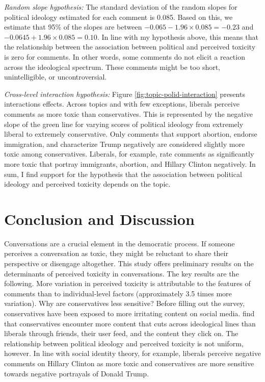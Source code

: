 \documentclass{article}
\begin{document}
\textit{Random slope hypothesis:} The standard deviation of the random slopes for political ideology estimated for each comment is 0.085. Based on this, we estimate that 95\% of the slopes are between $-0.065 - 1.96\times 0.085=-0.23$ and  $-0.0645 + 1.96 \times 0.085=0.10$. In line with my hypothesis above, this means that the relationship between the association between political and perceived toxicity is zero for comments. In other words, some comments do not elicit a reaction across the ideological spectrum. These comments might be too short, unintelligible, or uncontroversial. 

\textit{Cross-level interaction hypothesis:} Figure \ref{fig:topic-polid-interaction} presents interactions effects. Across topics and with few exceptions, liberals perceive comments as more toxic than conservatives. This is represented by the negative slope of the green line for varying scores of political ideology from extremely liberal to extremely conservative. Only comments that support abortion, endorse immigration, and characterize Trump negatively are considered slightly more toxic among conservatives. Liberals, for example, rate comments as significantly more toxic that portray immigrants, abortion, and Hillary Clinton negatively. In sum, I find support for the hypothesis that the association between political ideology and perceived toxicity depends on the topic. 



\section{Conclusion and Discussion}

Conversations are a crucial element in the democratic process. If someone perceives a conversation as toxic, they might be reluctant to share their perspective or disengage altogether. This study offers preliminary results on the determinants of perceived toxicity in conversations. The key results are the following. More variation in perceived toxicity is attributable to the features of comments than to individual-level factors (approximately 3.5 times more variation). Why are conservatives less sensitive? Before filling out the survey, conservatives have been exposed to more irritating content on social media. \citet{bakshy_exposure_2015} find that conservatives encounter more content that cuts across ideological lines than liberals through friends, their user feed, and the content they click on. The relationship between political ideology and perceived toxicity is not uniform, however. In line with social identity theory, for example, liberals perceive negative comments on Hillary Clinton as more toxic and conservatives are more sensitive towards negative portrayals of Donald Trump. 
\end{document}
